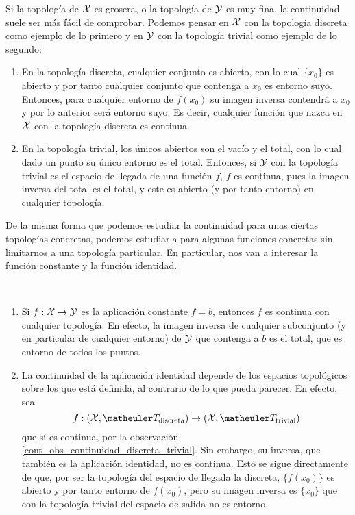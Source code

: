 \begin{obs}
	\label{cont_obs_continuidad_discreta_trivial}
	Si la topología de $\mathcal{X}$ es grosera, o la topología de $\mathcal{Y}$ es muy fina, la continuidad suele ser más fácil de comprobar. Podemos pensar en $\mathcal{X}$ con la topología discreta como ejemplo de lo primero y en $\mathcal{Y}$ con la topología trivial como ejemplo de lo segundo:
	
	\begin{enumerate}
		\item En la topología discreta, cualquier conjunto es abierto, con lo cual $\{x_0\}$ es abierto y por tanto cualquier conjunto que contenga a $x_0$ es entorno suyo. Entonces, para cualquier entorno de $f(x_0)$ su imagen inversa contendrá a $x_0$ y por lo anterior será entorno suyo. Es decir, cualquier función que nazca en $\mathcal{X}$ con la topología discreta es continua.
		
		\item En la topología trivial, los únicos abiertos son el vacío y el total, con lo cual dado un punto su único entorno es el total. Entonces, si $\mathcal{Y}$ con la topología trivial es el espacio de llegada de una función $f$, $f$ es continua, pues la imagen inversa del total es el total, y este es abierto (y por tanto entorno) en cualquier topología. \qedhere 
	\end{enumerate}
\end{obs}

De la misma forma que podemos estudiar la continuidad para unas ciertas topologías concretas, podemos estudiarla para algunas funciones concretas sin limitarnos a una topología particular. En particular, nos van a interesar la función constante y la función identidad.

\begin{obs} \
	\label{cont_obs_continuidad_cte_e_id}
	\begin{enumerate}
		\item Si $f:\mathcal{X}\to\mathcal{Y}$ es la aplicación constante $f=b$, entonces $f$ es continua con cualquier topología. En efecto, la imagen inversa de cualquier subconjunto (y en particular de cualquier entorno) de $\mathcal{Y}$ que contenga a $b$ es el total, que es entorno de todos los puntos.
		
		\item La continuidad de la aplicación identidad depende de los espacios topológicos sobre los que está definida, al contrario de lo que pueda parecer. En efecto, sea
		\[f:(\X,\T_\text{discreta})\to (\X,\T_\text{trivial})\]
		que sí es continua, por la observación \ref{cont_obs_continuidad_discreta_trivial}. Sin embargo, su inversa, que también es la aplicación identidad, no es continua. Esto se sigue directamente de que, por ser la topología del espacio de llegada la discreta, $\{f(x_0)\}$ es abierto y por tanto entorno de $f(x_0)$, pero su imagen inversa es $\{x_0\}$ que con la topología trivial del espacio de salida no es entorno. \qedhere
	\end{enumerate}
\end{obs}


